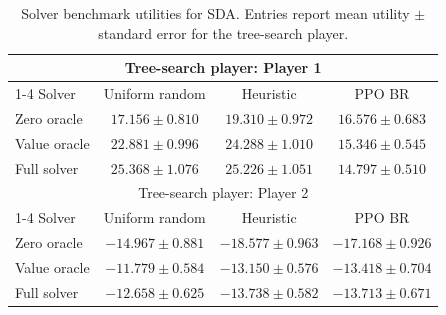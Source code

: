 \begin{table}[t]
\centering
\caption{Solver benchmark utilities for SDA. Entries report mean utility $\pm$ standard error for the tree-search player.}
\label{tab:sda-solver-benchmarks}
\begin{tabular}{@{}lccc@{}}
\toprule
\multicolumn{4}{c}{Tree-search player: Player 1} \\
\cmidrule(lr){1-4}
Solver & Uniform random & Heuristic & PPO BR \\
\midrule
Zero oracle & $17.156 \pm 0.810$ & $19.310 \pm 0.972$ & $\mathbf{16.576 \pm 0.683}$ \\
Value oracle & $22.881 \pm 0.996$ & $24.288 \pm 1.010$ & $15.346 \pm 0.545$ \\
Full solver & $\mathbf{25.368 \pm 1.076}$ & $\mathbf{25.226 \pm 1.051}$ & $14.797 \pm 0.510$ \\
\midrule
\multicolumn{4}{c}{Tree-search player: Player 2} \\
\cmidrule(lr){1-4}
Solver & Uniform random & Heuristic & PPO BR \\
\midrule
Zero oracle & $-14.967 \pm 0.881$ & $-18.577 \pm 0.963$ & $-17.168 \pm 0.926$ \\
Value oracle & $\mathbf{-11.779 \pm 0.584}$ & $\mathbf{-13.150 \pm 0.576}$ & $\mathbf{-13.418 \pm 0.704}$ \\
Full solver & $-12.658 \pm 0.625$ & $-13.738 \pm 0.582$ & $-13.713 \pm 0.671$ \\
\bottomrule
\end{tabular}
\end{table}
